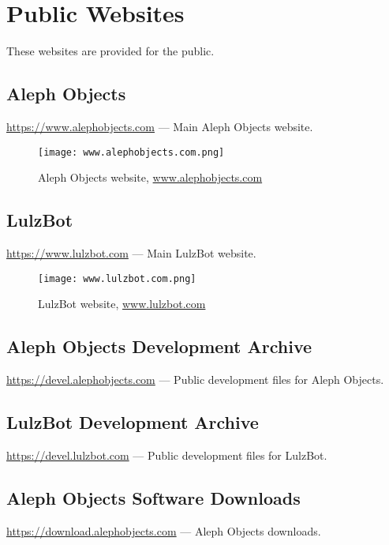 %
%
%
%
%

\section{Public Websites}
These websites are provided for the public.

\subsection{Aleph Objects}
\url{https://www.alephobjects.com} --- Main Aleph Objects website.
\begin{figure}[h!]
\texttt{[image: www.alephobjects.com.png]}
 \caption{Aleph Objects website, \href{www.alephobjects.com}{www.alephobjects.com}}
 \label{fig:wwwalephobjectscom}
\end{figure}

\subsection{LulzBot}
\url{https://www.lulzbot.com} --- Main LulzBot website.
\begin{figure}[h!]
\texttt{[image: www.lulzbot.com.png]}
 \caption{LulzBot website, \href{www.lulzbot.com}{www.lulzbot.com}}
 \label{fig:wwwlulzbotcom}
\end{figure}

\subsection{Aleph Objects Development Archive}
\url{https://devel.alephobjects.com} --- Public development files for
Aleph Objects.

\subsection{LulzBot Development Archive}
\url{https://devel.lulzbot.com} --- Public development files for LulzBot.

\subsection{Aleph Objects Software Downloads}
\url{https://download.alephobjects.com} --- Aleph Objects downloads.

